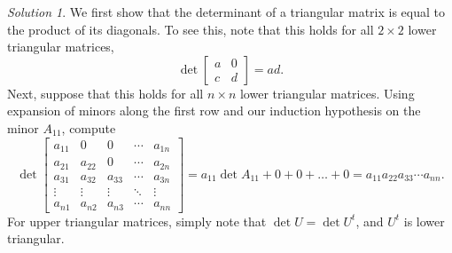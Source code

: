 \documentclass[11pt]{report}
\theoremstyle{remark}
\newtheorem*{solution}{Solution}
\begin{document}
    \begin{solution}
        We first show that the determinant of a triangular matrix is equal to the
        product of its diagonals. To see this, note that this holds for all $2
        \times 2$ lower triangular matrices, \[
            \det \begin{bmatrix}
                a & 0 \\ c & d
            \end{bmatrix} = ad.
        \] Next, suppose that this holds for all $n \times n$ lower triangular
        matrices. Using expansion of minors along the first row and our induction
        hypothesis on the minor $A_{11}$, compute \[
            \det \begin{bmatrix}
                a_{11} & 0 & 0 & \cdots & a_{1n} \\
                a_{21} & a_{22} & 0 & \cdots & a_{2n} \\
                a_{31} & a_{32} & a_{33} & \cdots & a_{3n} \\
                \vdots & \vdots & \vdots & \ddots & \vdots \\
                a_{n1} & a_{n2} & a_{n3} & \cdots & a_{nn}
            \end{bmatrix} = a_{11}\det{A_{11}} + 0 + 0 + \dots + 0 = a_{11}
            a_{22}a_{33} \cdots a_{nn}.
        \] For upper triangular matrices, simply note that $\det U = \det U^t$, and
        $U^t$ is lower triangular.


\end{solution}
\end{document}
